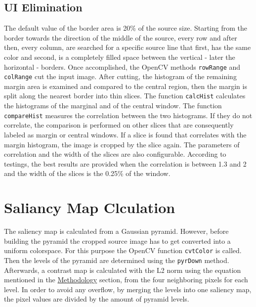 \documentclass[draft,final]{vutinfth} %
\begin{document}
	\subsection{UI Elimination}
	The default value of the border area is 20\% of the source size. 
	Starting from the border towards the direction of the middle of the source, every row and after then, every column, are searched for a specific source line that first, has the same color and second, is a completely filled space between the vertical - later the horizontal - borders.
	Once accomplished, the OpenCV methods \texttt{rowRange} and \texttt{colRange} cut the input image.
	After cutting, the histogram of the remaining margin area is examined and compared to the central region, then the margin is split along the nearest border into thin slices.
	The function \texttt{calcHist} calculates the histograms of the marginal and of the central window.
	The function \texttt{compareHist} measures the correlation between the two histograms. 
	If they do not correlate, the comparison is performed on other slices that are consequently labeled as margin or central windows.
	If a slice is found that correlates with the margin histogram, the image is cropped by the slice again. 
	The parameters of correlation and the width of the slices are also configurable.
	According to testings, the best results are provided when the correlation is between 1.3 and 2 and the width of the slices is the 0.25\% of the window.
	
	\section{Saliancy Map Clculation}
	The saliency map is calculated from a Gaussian pyramid.
	However, before building the pyramid the cropped source image has to get converted into a uniform colorspace.
	For this purpose the OpenCV function \texttt{cvtColor} is called.
	Then the levels of the pyramid are determined using the \texttt{pyrDown} method.
	Afterwards, a contrast map is calculated with the L2 norm using the equation mentioned in the \hyperref[saliencyCalculation]{Methodology} section, from the four neighboring pixels for each level.
	In order to avoid any overflow, by merging the levels into one saliency map, the pixel values are divided by the amount of pyramid levels.
	
\end{document}
